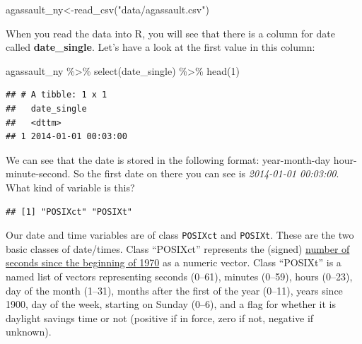\documentclass[
]{book}
\newenvironment{Shaded}{\begin{snugshade}}{\end{snugshade}}
\newcommand{\DecValTok}[1]{\textcolor[rgb]{0.00,0.00,0.81}{#1}}
\newcommand{\FunctionTok}[1]{\textcolor[rgb]{0.00,0.00,0.00}{#1}}
\newcommand{\NormalTok}[1]{#1}
\newcommand{\OtherTok}[1]{\textcolor[rgb]{0.56,0.35,0.01}{#1}}
\newcommand{\SpecialCharTok}[1]{\textcolor[rgb]{0.00,0.00,0.00}{#1}}
\newcommand{\StringTok}[1]{\textcolor[rgb]{0.31,0.60,0.02}{#1}}
\begin{document}
\begin{Shaded}
\begin{Highlighting}[]
\NormalTok{agassault\_ny}\OtherTok{\textless{}{-}}\FunctionTok{read\_csv}\NormalTok{(}\StringTok{"data/agassault.csv"}\NormalTok{)}
\end{Highlighting}
\end{Shaded}

When you read the data into R, you will see that there is a column for date called \textbf{date\_single}. Let's have a look at the first value in this column:

\begin{Shaded}
\begin{Highlighting}[]
\NormalTok{agassault\_ny }\SpecialCharTok{\%\textgreater{}\%} 
  \FunctionTok{select}\NormalTok{(date\_single) }\SpecialCharTok{\%\textgreater{}\%} 
  \FunctionTok{head}\NormalTok{(}\DecValTok{1}\NormalTok{)}
\end{Highlighting}
\end{Shaded}

\begin{verbatim}
## # A tibble: 1 x 1
##   date_single        
##   <dttm>             
## 1 2014-01-01 00:03:00
\end{verbatim}

We can see that the date is stored in the following format: year-month-day hour-minute-second. So the first date on there you can see is \emph{2014-01-01 00:03:00}. What kind of variable is this?

\begin{Shaded}
\end{Shaded}

\begin{verbatim}
## [1] "POSIXct" "POSIXt"
\end{verbatim}

Our date and time variables are of class \texttt{POSIXct} and \texttt{POSIXt}. These are the two basic classes of date/times. Class ``POSIXct'' represents the (signed) \href{https://en.wikipedia.org/wiki/Unix_time}{number of seconds since the beginning of 1970} as a numeric vector. Class ``POSIXt'' is a named list of vectors representing seconds (0--61), minutes (0--59), hours (0--23), day of the month (1--31), months after the first of the year (0--11), years since 1900, day of the week, starting on Sunday (0--6), and a flag for whether it is daylight savings time or not (positive if in force, zero if not, negative if unknown).
\end{document}
